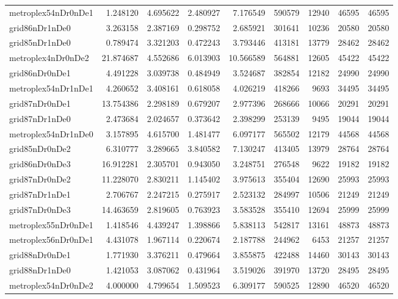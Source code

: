 \begin{longtable}{|l|r|r|r|r|r|r|r|r|}
metroplex54nDr0nDe1 & 1.248120 & 4.695622 & 2.480927 & 7.176549 & 590579 & 12940 & 46595 & 46595 \\
grid86nDr1nDe0 & 3.263158 & 2.387169 & 0.298752 & 2.685921 & 301641 & 10236 & 20580 & 20580 \\
grid85nDr1nDe0 & 0.789474 & 3.321203 & 0.472243 & 3.793446 & 413181 & 13779 & 28462 & 28462 \\
metroplex4nDr0nDe2 & 21.874687 & 4.552686 & 6.013903 & 10.566589 & 564881 & 12605 & 45422 & 45422 \\
grid86nDr0nDe1 & 4.491228 & 3.039738 & 0.484949 & 3.524687 & 382854 & 12182 & 24990 & 24990 \\
metroplex54nDr1nDe1 & 4.260652 & 3.408161 & 0.618058 & 4.026219 & 418266 & 9693 & 34495 & 34495 \\
grid87nDr0nDe1 & 13.754386 & 2.298189 & 0.679207 & 2.977396 & 268666 & 10066 & 20291 & 20291 \\
grid87nDr1nDe0 & 2.473684 & 2.024657 & 0.373642 & 2.398299 & 253139 & 9495 & 19044 & 19044 \\
metroplex54nDr1nDe0 & 3.157895 & 4.615700 & 1.481477 & 6.097177 & 565502 & 12179 & 44568 & 44568 \\
grid85nDr0nDe2 & 6.310777 & 3.289665 & 3.840582 & 7.130247 & 413405 & 13979 & 28764 & 28764 \\
grid86nDr0nDe3 & 16.912281 & 2.305701 & 0.943050 & 3.248751 & 276548 & 9622 & 19182 & 19182 \\
grid87nDr0nDe2 & 11.228070 & 2.830211 & 1.145402 & 3.975613 & 355404 & 12690 & 25993 & 25993 \\
grid87nDr1nDe1 & 2.706767 & 2.247215 & 0.275917 & 2.523132 & 284997 & 10506 & 21249 & 21249 \\
grid87nDr0nDe3 & 14.463659 & 2.819605 & 0.763923 & 3.583528 & 355410 & 12694 & 25999 & 25999 \\
metroplex55nDr0nDe1 & 1.418546 & 4.439247 & 1.398866 & 5.838113 & 542817 & 13161 & 48873 & 48873 \\
metroplex56nDr0nDe1 & 4.431078 & 1.967114 & 0.220674 & 2.187788 & 244962 & 6453 & 21257 & 21257 \\
grid88nDr0nDe1 & 1.771930 & 3.376211 & 0.479664 & 3.855875 & 422488 & 14460 & 30143 & 30143 \\
grid88nDr1nDe0 & 1.421053 & 3.087062 & 0.431964 & 3.519026 & 391970 & 13720 & 28495 & 28495 \\
metroplex54nDr0nDe2 & 4.000000 & 4.799654 & 1.509523 & 6.309177 & 590525 & 12890 & 46520 & 46520 \\

\end{longtable}
